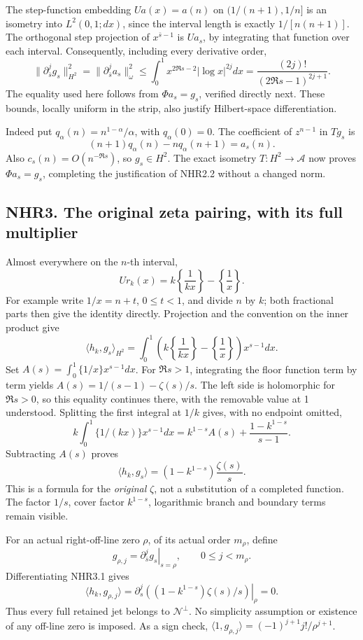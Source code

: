 The step-function embedding \(Ua(x)=a(n)\) on \((1/(n+1),1/n]\) is an
isometry into \(L^2(0,1;dx)\), since the interval length is exactly
\(1/[n(n+1)]\). The orthogonal step projection of \(x^{\bar s-1}\) is
\(Ua_s\), by integrating that function over each interval. Consequently,
including every derivative order, \[
 \|\partial_{\bar s}^{j}g_s\|_{H^2}^2
 =\|\partial_{\bar s}^{j}a_s\|_\omega^2
 \le\int_0^1x^{2\Re s-2}|\log x|^{2j}dx
 =\frac{(2j)!}{(2\Re s-1)^{2j+1}}.
 \tag{NHR2.2}
\] The equality used here follows from \(\Phi a_s=g_s\), verified
directly next. These bounds, locally uniform in the strip, also justify
Hilbert-space differentiation.

Indeed put \(q_\alpha(n)=n^{1-\alpha}/\alpha\), with \(q_\alpha(0)=0\).
The coefficient of \(z^{n-1}\) in \(Tg_s\) is \[
 (n+1)q_\alpha(n)-nq_\alpha(n+1)=a_s(n).
\] Also \(c_s(n)=O(n^{-\Re s})\), so \(g_s\in H^2\). The exact isometry
\(T:H^2\to\mathcal A\) now proves \(\Phi a_s=g_s\), completing the
justification of NHR2.2 without a changed norm.

\subsection{NHR3. The original zeta pairing, with its full
multiplier}\label{nhr3.-the-original-zeta-pairing-with-its-full-multiplier}

Almost everywhere on the \(n\)-th interval, \[
 Ur_k(x)=k\left\{\frac1{kx}\right\}-\left\{\frac1x\right\}.
\] For example write \(1/x=n+t\), \(0\le t<1\), and divide \(n\) by
\(k\); both fractional parts then give the identity directly. Projection
and the convention on the inner product give \[
 \langle h_k,g_s\rangle_{H^2}
 =\int_0^1\left(k\left\{\frac1{kx}\right\}-\left\{\frac1x\right\}\right)x^{s-1}dx.
\] Set \(A(s)=\int_0^1\{1/x\}x^{s-1}dx\). For \(\Re s>1\), integrating
the floor function term by term yields \(A(s)=1/(s-1)-\zeta(s)/s\). The
left side is holomorphic for \(\Re s>0\), so this equality continues
there, with the removable value at 1 understood. Splitting the first
integral at \(1/k\) gives, with no endpoint omitted, \[
 k\int_0^1\{1/(kx)\}x^{s-1}dx
 =k^{1-s}A(s)+\frac{1-k^{1-s}}{s-1}.
\] Subtracting \(A(s)\) proves \[
 \boxed{\langle h_k,g_s\rangle=(1-k^{1-s})\frac{\zeta(s)}s.}
 \tag{NHR3.1}
\] This is a formula for the \emph{original} \(\zeta\), not a
substitution of a completed function. The factor \(1/s\), cover factor
\(k^{1-s}\), logarithmic branch and boundary terms remain visible.

For an actual right-off-line zero \(\rho\), of its actual order
\(m_\rho\), define \[
 g_{\rho,j}=\left.\partial_{\bar s}^{j}g_s\right|_{s=\rho},
 \qquad0\le j<m_\rho.
\] Differentiating NHR3.1 gives \[
 \langle h_k,g_{\rho,j}\rangle
 =\left.\partial_s^j\left((1-k^{1-s})\zeta(s)/s\right)\right|_{\rho}=0.
 \tag{NHR3.2}
\] Thus every full retained jet belongs to \(\mathcal N^\perp\). No
simplicity assumption or existence of any off-line zero is imposed. As a
sign check, \(\langle1,g_{\rho,j}\rangle=(-1)^{j+1}j!/\rho^{j+1}\).

